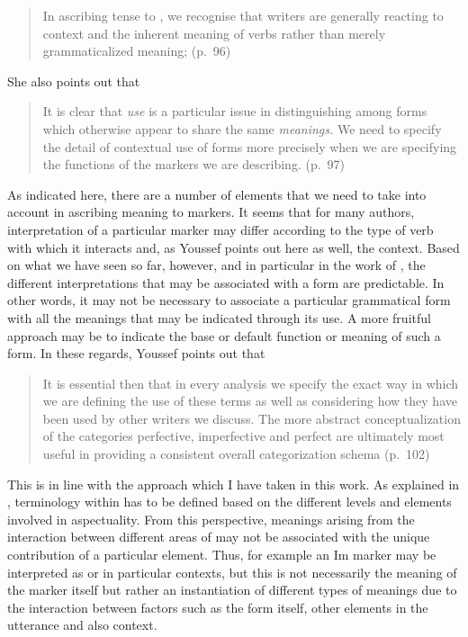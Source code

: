 \begin{quote}
In ascribing tense to \NULL, we recognise that writers are generally
reacting to context and the inherent meaning of verbs rather than
merely grammaticalized meaning; (p.~96)
\end{quote}

She also points out that

\begin{quote}
  It is clear that \textit{use} is a particular issue in
  distinguishing among forms which otherwise appear to share the same
  \textit{meanings.} We need to specify the detail of contextual use
  of forms more precisely when we are specifying the functions of the
  markers we are describing. (p.~97)
\end{quote}

As indicated here, there are a number of elements that we need to take
into account in ascribing meaning to  markers.  It
seems that for many authors, interpretation of a particular marker may
differ according to the type of verb with which it interacts and, as
Youssef points out here as well, the context.  Based on what we have
seen so far, however, and in particular in the work of
\citet{Sidnell2002}, the different interpretations that may be
associated with a form are predictable.  In other words, it may not be
necessary to associate a particular grammatical form with all the
meanings that may be indicated through its use.  A more fruitful
approach may be to indicate the base or default function or meaning of
such a form.  In these regards, Youssef points out that

\begin{quote}
It is essential then that in every analysis we specify the exact way
in which we are defining the use of these terms as well as considering
how they have been used by other writers we discuss. The more abstract
conceptualization of the categories perfective, imperfective and
perfect are ultimately most useful in providing a consistent overall
categorization schema (p.~102)
\end{quote}

This is in line with the approach which I have taken in this work.  As
explained in , terminology within  has to be defined
based on the different levels and elements involved in aspectuality.
From this perspective, meanings arising from the interaction between
different areas of  may not be associated with the unique
contribution of a particular element.  Thus, for example an
Im marker may be interpreted as  or
 in particular contexts, but this is not necessarily the
meaning of the marker itself but rather an instantiation of different
types of  meanings due to the interaction between factors
such as the form itself, other elements in the utterance and also
context.

